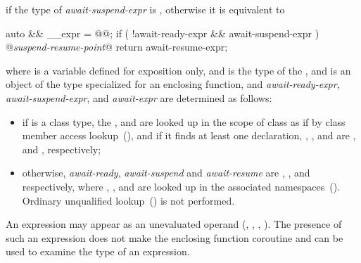 if the type of \textit{await-suspend-expr} is , otherwise it is equivalent to

\begin{codeblock}
{
  auto && __expr = @@;
  if ( !await-ready-expr && await-suspend-expr ) {
    @\textit{suspend-resume-point}@
  }
  return await-resume-expr;
}
\end{codeblock}

where  is a variable defined for
exposition only, and  is the type of the
, and 
is an object of the  type specialized for an enclosing function,
and \textit{await-ready-expr}, \textit{await-suspend-expr}, and \textit{await-expr} are
determined as follows:

\begin{itemize}
	\item if  is a class type, the 
	,  and  are 
	looked up in the scope of class 
	as if by class member access lookup~(), and if it finds at least one declaration, 
	, , and  are
	,  and ,
	respectively;
	
	\item otherwise, \textit{await-ready}, \textit{await-suspend} and \textit{await-resume} are 
	, , and  
	respectively, where 
	, , and  are 
	looked up in the associated namespaces~().
	\enternote Ordinary unqualified lookup~() is not
	performed. \exitnote
\end{itemize}


\pnum
An  expression may appear as an unevaluated operand (, , , ). The presence of such an  expression does not make the enclosing function coroutine and can be used to examine the type of an  expression.
 
